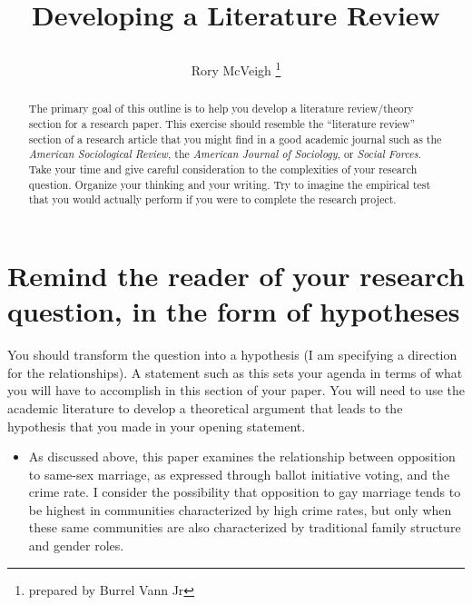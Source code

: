 \documentclass[12pt]{article}
\begin{document}
\title{\begin{singlespace}Developing a Literature Review\end{singlespace}}
\author[]{Rory McVeigh
\thanks{prepared by Burrel Vann Jr}
}
\doublespacing
\date{}
\maketitle



\begin{abstract}
\begin{singlespace}
The primary goal of this outline is to help you develop a literature review/theory section for a research paper. This exercise should resemble the ``literature review'' section of a research article that you might find in a good academic journal such as the {\it{American Sociological Review}}, the {\it{American Journal of Sociology}}, or {\it{Social Forces}}. Take your time and give careful consideration to the complexities of your research question. Organize your thinking and your writing. Try to imagine the empirical test that you would actually perform if you were to complete the research project.
\end{singlespace}
\end{abstract}
\newpage



\section{{\textbf{Remind the reader of your research question, in the form of hypotheses}}}
\begin{singlespace}
You should transform the question into a hypothesis (I am specifying a direction for the relationships). A statement such as this sets your agenda in terms of what you will have to accomplish in this section of your paper. You will need to use the academic literature to develop a theoretical argument that leads to the hypothesis that you made in your opening statement.
\begin{itemize}
\item As discussed above, this paper examines the relationship between opposition to same-sex marriage, as expressed through ballot initiative voting, and the crime rate. I consider the possibility that opposition to gay marriage tends to be highest in communities characterized by high crime rates, but only when these same communities are also characterized by traditional family structure and gender roles.
\end{itemize}
\end{singlespace}
\end{document}
